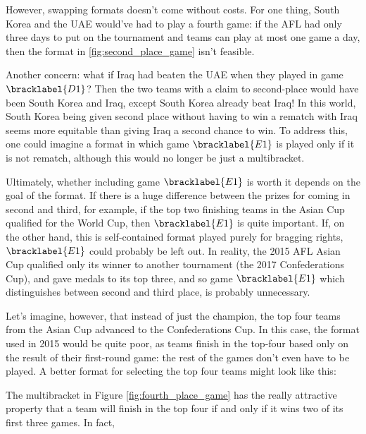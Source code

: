 {    However, swapping formats doesn't come without costs. For one thing, South Korea and the UAE would've had to play a fourth game: if the AFL had only three days to put on the tournament and teams can play at most one game a day, then the format in \ref{fig:second_place_game} isn't feasible.

    Another concern: what if Iraq had beaten the UAE when they played in game $\bracklabel{D1}$? Then the two teams with a claim to second-place would have been South Korea and Iraq, except South Korea already beat Iraq! In this world, South Korea being given second place without having to win a rematch with Iraq seems more equitable than giving Iraq a second chance to win. To address this, one could imagine a format in which game $\bracklabel{E1}$ is played only if it is not rematch, although this would no longer be just a multibracket.

    Ultimately, whether including game $\bracklabel{E1}$ is worth it depends on the goal of the format. If there is a huge difference between the prizes for coming in second and third, for example, if the top two finishing teams in the Asian Cup qualified for the World Cup, then $\bracklabel{E1}$ is quite important. If, on the other hand, this is self-contained format played purely for bragging rights, $\bracklabel{E1}$ could probably be left out. In reality, the 2015 AFL Asian Cup qualified only its winner to another tournament (the 2017 Confederations Cup), and gave medals to its top three, and so game $\bracklabel{E1}$ which distinguishes between second and third place, is probably unnecessary.

    Let's imagine, however, that instead of just the champion, the top four teams from the Asian Cup advanced to the Confederations Cup. In this case, the format used in 2015 would be quite poor, as teams finish in the top-four based only on the result of their first-round game: the rest of the games don't even have to be played. A better format for selecting the top four teams might look like this:


    The multibracket in Figure \ref{fig:fourth_place_game} has the really attractive property that a team will finish in the top four if and only if it wins two of its first three games. In fact,

     


}